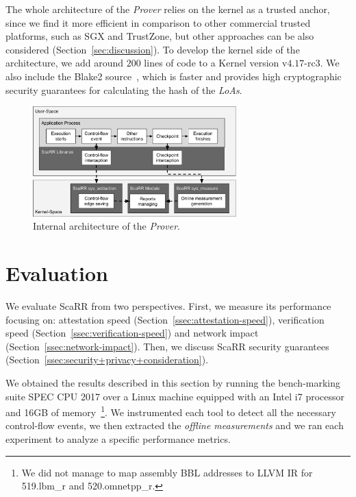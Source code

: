 The whole architecture of the \emph{Prover} relies on the kernel as a trusted 
anchor, since we find it more efficient in comparison to other commercial 
trusted platforms, such as SGX and TrustZone, but other approaches can be also 
considered (Section~\ref{sec:discussion}). To develop the kernel side of the 
architecture, we add around $200$ lines of code to a Kernel version 
v$4.17$-rc$3$.
We also include the Blake2 source~\cite{Aumasson2014,blake2}, which is faster 
and provides high cryptographic security guarantees for calculating the hash of 
the \emph{LoAs}.
\begin{figure}[t]
	\centering
	\includegraphics[width=0.7\textwidth]{fig_c4/architecture.pdf}
	\caption{Internal architecture of the \emph{Prover}.}
	\label{fig:architecture_scarr}
\end{figure}

\section{Evaluation}
\label{sec:evaluation}
We evaluate ScaRR from two perspectives.
First, we measure its performance focusing on: attestation speed 
(Section~\ref{ssec:attestation-speed}), verification speed 
(Section~\ref{ssec:verification-speed}) and network impact 
(Section~\ref{ssec:network-impact}).
Then, we discuss ScaRR security guarantees 
(Section~\ref{ssec:security+privacy+consideration}). 

We obtained the results described in this section by running the bench-marking 
suite SPEC CPU 2017 over a Linux machine
equipped with an Intel i7 processor and 16GB of memory~\footnote{We did not 
manage to map assembly BBL addresses to LLVM IR for 519.lbm\_r and 
520.omnetpp\_r.}.
We instrumented each tool to detect all the necessary control-flow events, we 
then extracted the \emph{offline measurements} and we ran each experiment to 
analyze a specific performance metrics. 

